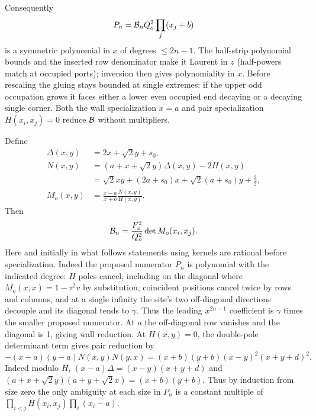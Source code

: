 Consequently
\[
 P_n={\cal B}_n Q_o^2\prod_j(x_j+b)
\]
is a symmetric polynomial in \(x\) of degrees \(\le2n-1\). The half-strip polynomial bounds and the inserted row denominator make it Laurent in \(z\) (half-powers match at occupied ports); inversion then gives polynomiality in \(x\). Before rescaling the gluing stays bounded at single extremes: if the upper odd occupation grows it faces either a lower even occupied end decaying or a decaying single corner. Both the wall specialization \(x=a\) and pair specialization \(H(x_i,x_j)=0\) reduce \({\cal B}\) without multipliers.

Define
\[
\begin{aligned}
 \Delta(x,y)&=2x+\sqrt2 y+s_0,\\
 N(x,y)&=(a+x+\sqrt2 y)\Delta(x,y)-2H(x,y)\\
       &=\sqrt2 xy+(2a+s_0)x+\sqrt2(a+s_0)y+\tfrac32 ,\\
 M_o(x,y)&=\frac{x-a}{x+b}\frac{N(x,y)}{H(x,y)}.
\end{aligned}
\]
Then
\[
 {\cal B}_n=\frac{F_o^2}{Q_o^2}\det M_o(x_i,x_j).
\]
Here and initially in what follows statements using kernels are rational before specialization. Indeed the proposed numerator \(P_n\) is polynomial with the indicated degree: \(H\) poles cancel, including on the diagonal where \(M_o(x,x)=1-\tau^2 v\) by substitution, coincident positions cancel twice by rows and columns, and at a single infinity the site's two off-diagonal directions decouple and its diagonal tends to \(\gamma\). Thus the leading \(x^{2n-1}\) coefficient is \(\gamma\) times the smaller proposed numerator. At \(a\) the off-diagonal row vanishes and the diagonal is 1, giving wall reduction. At \(H(x,y)=0\), the double-pole determinant term gives pair reduction by
\[
 -(x-a)(y-a) N(x,y)N(y,x)=(x+b)(y+b)(x-y)^2(x+y+d)^2 .
\]
Indeed modulo \(H\), \((x-a)\Delta=(x-y)(x+y+d)\) and \((a+x+\sqrt2 y)(a+y+\sqrt2 x)=(x+b)(y+b)\). Thus by induction from size zero the only ambiguity at each size in \(P_n\) is a constant multiple of \(\prod_{i<j}H(x_i,x_j)\prod_i(x_i-a)\).

